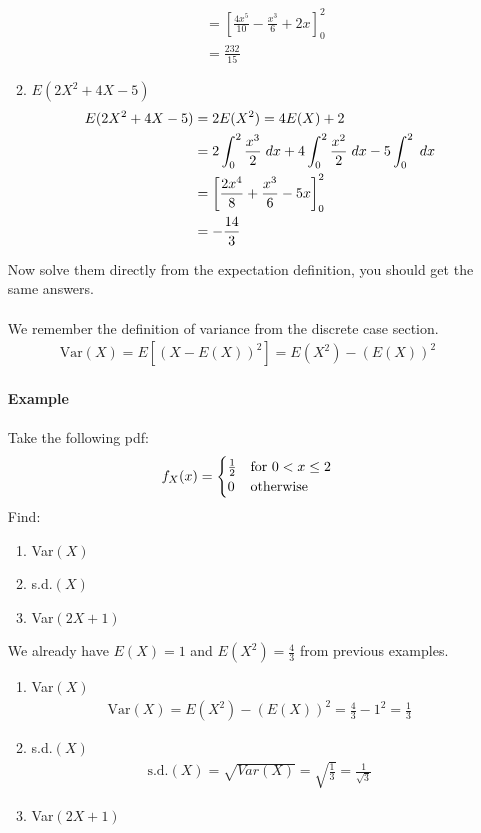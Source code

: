 \documentclass[,oneside]{article}
\begin{document}
\begin{enumerate}
\begin{enumerate}
\begin{align*}
&= \left [ \frac{4x^5}{10}-\frac{x^3}{6}+2x\right]_{0}^{2}\\
&=\frac{232}{15}
\end{align*}
\item $E(2X^2+4X-5)$
\begin{align*}
 E(2X^2+4X-5) &=2E(X^2)=4E(X)+2\\
&=  2\int_{0}^{2} \frac{x^3}{2}\hspace{0.1cm}dx+4\int_{0}^{2} \frac{x^2}{2}\hspace{0.1cm}dx-5\int_{0}^{2} \hspace{0.1cm}dx\\
&= \left [ \frac{2x^4}{8}+\frac{x^3}{6}-5x\right]_{0}^{2}\\
&=-\frac{14}{3}
\end{align*}
\end{enumerate}
Now solve them directly from the expectation definition, you should get the same answers.\\ \\
We remember the definition of variance from the discrete case section.
\begin{align*}
\text{Var}(X)=E[(X-E(X))^2]=E(X^2)-(E(X))^2
\end{align*}\\
\textbf{Example}\\ \\
Take the following pdf:
\[
f_X(x)=
\begin{cases}
\frac{1}{2} & \text{for } 0 < x \leq 2 \\
0 & $otherwise$
\end{cases} \] 
Find:
\begin{enumerate}
\item Var$(X)$
\item s.d.$(X)$
\item Var$(2X+1)$
\end{enumerate}
We already have $E(X)=1$ and $E(X^2)=\frac{4}{3}$ from previous examples.\\
\begin{enumerate}
\item Var$(X)$
\begin{align*}
\text{Var}(X)=E(X^2)-(E(X))^2=\frac{4}{3}-1^2=\frac{1}{3}
\end{align*}
\item s.d.$(X)$
\begin{align*}
\text{s.d.}(X)=\sqrt{Var(X)}=\sqrt{\frac{1}{3}}=\frac{1}{\sqrt{3}}
\end{align*}
\item Var$(2X+1)$

\end{enumerate}
\end{enumerate}
\end{document}
